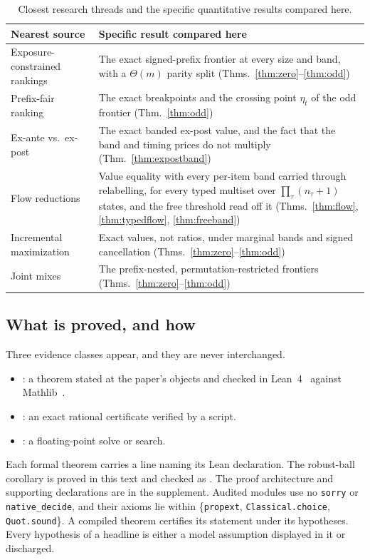 \begin{table}[h]
\caption{Closest research threads and the specific quantitative results compared here.}
\label{tab:prior}
\centering
\footnotesize
\begin{tabular}{@{}p{}p{}@{}}
\toprule
Nearest source & Specific result compared here \\
\midrule
Exposure-constrained rankings~\cite{singh2018} & The exact signed-prefix frontier at every
size and band, with a $\Theta(m)$ parity split (Thms.~\ref{thm:zero}--\ref{thm:odd}) \\
Prefix-fair ranking~\cite{celis2018} & The exact breakpoints and the crossing point
$\eta_{t}$ of the odd frontier (Thm.~\ref{thm:odd}) \\
Ex-ante vs.\ ex-post~\cite{singh2021,freeman2020} & The exact banded ex-post value, and the
fact that the band and timing prices do not multiply (Thm.~\ref{thm:expostband}) \\
Flow reductions~\cite{schrijver2003} & Value equality with every per-item band carried
through relabelling, for every typed multiset over $\prod_\tau(n_\tau+1)$ states, and the free
threshold read off it (Thms.~\ref{thm:flow}, \ref{thm:typedflow}, \ref{thm:freeband}) \\
Incremental maximization~\cite{disser2023,bienkowski2026} & Exact values, not ratios, under
marginal bands and signed cancellation (Thms.~\ref{thm:zero}--\ref{thm:odd}) \\
Joint mixes~\cite{koike2022} & The prefix-nested, permutation-restricted frontiers
(Thms.~\ref{thm:zero}--\ref{thm:odd}) \\
\bottomrule
\end{tabular}
\end{table}

\subsection{What is proved, and how}

Three evidence classes appear, and they are never interchanged.
\begin{itemize}
\item \PROVED: a theorem stated at the paper's objects and checked in
Lean~4~\cite{demoura2021} against Mathlib~\cite{mathlib2020}.
\item \CERT: an exact rational certificate verified by a script.
\item \NUM: a floating-point solve or search.
\end{itemize}
Each formal theorem carries a line naming its Lean declaration. The robust-ball corollary
is proved in this text and checked as . The proof architecture and supporting
declarations are in the supplement. Audited modules use no \texttt{sorry} or
\texttt{native\_decide}, and their axioms lie within \{\texttt{propext},
\texttt{Classical.choice}, \texttt{Quot.sound}\}. A compiled theorem certifies its statement
under its hypotheses. Every hypothesis of a headline is either a model assumption displayed
in it or discharged.

